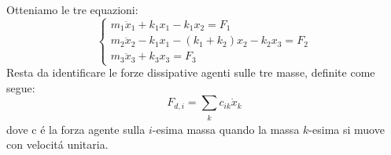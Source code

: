 \documentclass[12pt,a4paper]{article}
\begin{document}
 		Otteniamo le tre equazioni:
 		\[
 		\begin{cases}
 			m_1 \ddot{x}_1 + k_1x_1 - k_1 x_2 = F_1
 			\\
 			m_2 \ddot{x}_2 - k_1 x_1 - (k_1 +k_2 )x_2 - k_2 x_3  = F_2
 			\\
 			m_3 \ddot{x}_3 + k_3 x_3 = F_3
 		\end{cases}
 		\]
 		Resta da identificare le forze dissipative agenti sulle tre masse, definite come segue:
 		\begin{equation}
 			F_{ d,i} =  \sum_{\substack{k}} c_{ik} \dot{x}_k
 		\end{equation}
 		dove c \'e la forza agente sulla $i$-esima massa quando la massa $k$-esima si muove con velocit\'a unitaria. 
 
 
 
 
 
\end{document}
